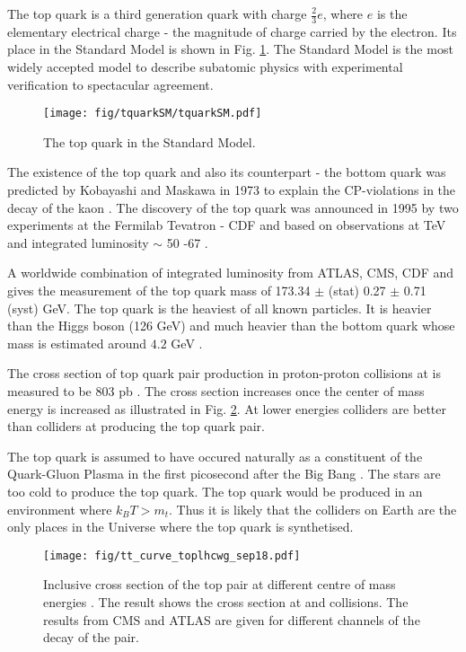 The top quark is a third generation quark with charge $\frac{2}{3}e$, where $e$ is the elementary electrical charge - the magnitude of charge carried by the electron. Its place in the Standard Model is shown in Fig. \ref{fig:top_quarkSM}. The Standard Model is the most widely accepted model to describe subatomic physics with experimental verification to spectacular agreement.

  \begin{figure}[hbtp]

    \centering
    \texttt{[image: fig/tquarkSM/tquarkSM.pdf]}
    \caption{The top quark in the Standard Model.}
    \label{fig:top_quarkSM}
    
  \end{figure}

The existence of the top quark and also its counterpart - the bottom quark was predicted by Kobayashi and Maskawa in 1973 to explain the CP-violations in the decay of the kaon \cite{Kobayashi:1973fv}. The discovery of the top quark was announced in 1995 by two experiments at the Fermilab Tevatron - CDF \cite{Abe:1995hr} and \DZERO \cite{D0:1995jca} based on observations at  TeV and integrated luminosity $\sim$ 50 -67 \fbinv.

A worldwide combination of integrated luminosity from ATLAS, CMS, CDF and \DZERO gives the measurement of the top quark mass of 173.34 $\pm$ (stat) 0.27 $\pm$ 0.71 (syst) GeV. The top quark is the heaviest of all known particles. It is heavier than the Higgs boson (126 GeV) and much heavier than the bottom quark whose mass is estimated around $4.2$ GeV \cite{Hoang:1999ye}.

The cross section of top quark pair production in proton-proton collisions at \TeV is measured to be 803 pb \cite{Sirunyan:2018goh}. The cross section increases once the center of mass energy is increased as illustrated in Fig. \ref{fig:tt_curve_toplhcwg_sep18}. At lower energies \Pp\Pap colliders are better than \Pp\Pp colliders at producing the top quark pair.

The top quark is assumed to have occured naturally as a constituent of the Quark-Gluon Plasma in the first picosecond after the Big Bang \cite{Husdal:2016haj}. The stars are too cold to produce the top quark. The top quark would be produced in an environment where $k_{B}T>m_{t}$. Thus it is likely that the colliders on Earth are the only places in the Universe where the top quark is synthetised.

\begin{figure}[hbtp]

  \centering
  \texttt{[image: fig/tt\_curve\_toplhcwg\_sep18.pdf]}
  \caption{Inclusive cross section of the top pair at different centre of mass energies \cite{twiki:tt_curve_toplhcwg_sep18}. The result shows the cross section at \Pp\Pp and \Pp\Pap collisions. The results from CMS and ATLAS are given for different channels of the decay of the \ttbar pair.}
  \label{fig:tt_curve_toplhcwg_sep18}
  
\end{figure}


